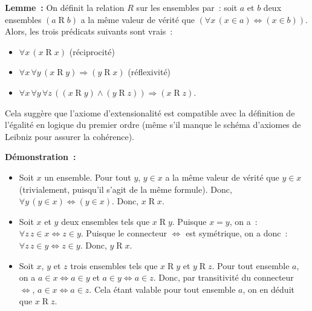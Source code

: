 \noindent\textbf{Lemme :} 
    On définit la relation $R$ sur les ensembles par : soit $a$ et $b$ deux ensembles $(a \mathrel{R} b)$ a la même valeur de vérité que $(\forall x \, (x \in a) \Leftrightarrow (x \in b))$. 
    Alors, les trois prédicats suivants sont vrais :
    \begin{itemize}[nosep]
        \item $\forall x \, (x \mathrel{R} x)$ (réciprocité)
        \item $\forall x \, \forall y \, (x \mathrel{R} y) \Rightarrow (y \mathrel{R} x)$ (réflexivité)
        \item $\forall x \, \forall y \, \forall z \, ((x \mathrel{R} y) \wedge (y \mathrel{R} z)) \Rightarrow (x \mathrel{R} z)$.
    \end{itemize}
    Cela suggère que l'axiome d'extensionalité est compatible avec la définition de l'égalité en logique du premier ordre (même s'il manque le schéma d'axiomes de Leibniz pour assurer la cohérence).

\medskip

\noindent\textbf{Démonstration :} 
\begin{itemize}[nosep]
    \item Soit $x$ un ensemble. Pour tout $y$, $y \in x$ a la même valeur de vérité que $y \in x$ (trivialement, puisqu'il s'agit de la même formule).
        Donc, $\forall y \, (y \in x) \Leftrightarrow (y \in x)$. 
        Donc, $x \mathrel{R} x$.
    \item Soit $x$ et $y$ deux ensembles tels que $x \mathrel{R} y$. 
        Puisque $x = y$, on a : $\forall z \, z \in x \Leftrightarrow z \in y$. 
        Puisque le connecteur $\Leftrightarrow$ est symétrique, on a donc : $\forall z \, z \in y \Leftrightarrow z \in y$.
        Donc, $y \mathrel{R} x$.
    \item Soit $x$, $y$ et $z$ trois ensembles tels que $x \mathrel{R} y$ et $y \mathrel{R} z$. 
        Pour tout ensemble $a$, on a $a \in x \Leftrightarrow a \in y$ et $a \in y \Leftrightarrow a \in z$. 
        Donc, par transitivité du connecteur $\Leftrightarrow$, $a \in x \Leftrightarrow a \in z$. 
        Cela étant valable pour tout ensemble $a$, on en déduit que $x \mathrel{R} z$.
\end{itemize}
\done

\medskip

